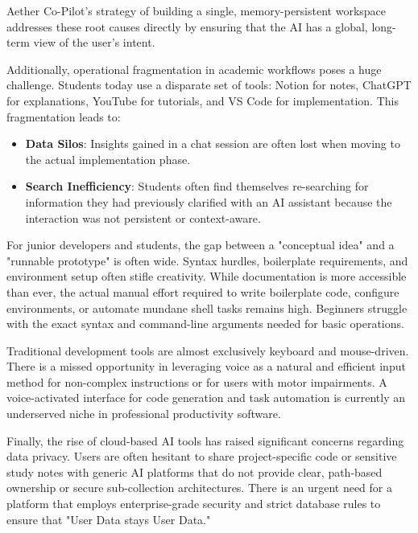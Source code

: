 Aether Co-Pilot's strategy of building a single, memory-persistent workspace addresses these root causes directly by ensuring that the AI has a global, long-term view of the user's intent.

Additionally, operational fragmentation in academic workflows poses a huge challenge. Students today use a disparate set of tools: Notion for notes, ChatGPT for explanations, YouTube for tutorials, and VS Code for implementation. This fragmentation leads to:
\begin{itemize}
    \item \textbf{Data Silos}: Insights gained in a chat session are often lost when moving to the actual implementation phase.
    \item \textbf{Search Inefficiency}: Students often find themselves re-searching for information they had previously clarified with an AI assistant because the interaction was not persistent or context-aware.
\end{itemize}

For junior developers and students, the gap between a "conceptual idea" and a "runnable prototype" is often wide. Syntax hurdles, boilerplate requirements, and environment setup often stifle creativity. While documentation is more accessible than ever, the actual manual effort required to write boilerplate code, configure environments, or automate mundane shell tasks remains high. Beginners struggle with the exact syntax and command-line arguments needed for basic operations.

Traditional development tools are almost exclusively keyboard and mouse-driven. There is a missed opportunity in leveraging voice as a natural and efficient input method for non-complex instructions or for users with motor impairments. A voice-activated interface for code generation and task automation is currently an underserved niche in professional productivity software.

Finally, the rise of cloud-based AI tools has raised significant concerns regarding data privacy. Users are often hesitant to share project-specific code or sensitive study notes with generic AI platforms that do not provide clear, path-based ownership or secure sub-collection architectures. There is an urgent need for a platform that employs enterprise-grade security and strict database rules to ensure that "User Data stays User Data."

\newpage
